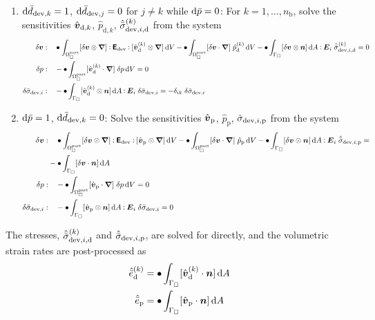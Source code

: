 \documentclass[a4paper]{article}
\newcommand{\particle}{\mathrm{part}}
\newcommand{\dep}{\mathrm{p}}
\newcommand{\ded}{\mathrm{d}}
\begin{document}
\begin{enumerate}
 \item $\operatorname{d \!}\bar{d}_{\mathrm{dev},k} = 1$, $\operatorname{d \!}\bar{d}_{\mathrm{dev},j} = 0$ for $j\neq k$ while $\operatorname{d \!}\bar{p} = 0$: For $k = 1, \ldots, n_\mathrm{b}$, solve the sensitivities $\hat{\ta v}_{\ded,k}$, $\hat{p}_{\ded,k}$, $\hat{\bar{\sigma}}_{\dev,i,\ded}^{(k)}$ from the system 
\begin{subequations}\label{eq:sensitivities_d}
\begin{align}
 \delta\ta v :&\quad 
 \bullet \int_{\Omega_\Box^\particle} [\delta\ta v\outerp\diff] \dprod \tf E_\dev \dprod [\hat{\ta v}_{\ded}^{(k)}\outerp\diff] \dif V - \bullet\int_{\Omega_\Box^\particle} [\delta\ta v\cdot\diff]\;\hat{p}_{\ded}^{(k)} \dif V 
  -\bullet \int_{\Gamma_\Box} [\delta\ta v\outerp\ta n] \dif A\dprod \ts E_i\;\hat{\bar{\sigma}}_{\dev,i,\ded}^{(k)}
  = 0
 \\ %
 \delta p :&\quad 
 -\bullet \int_{\Omega_\Box^\particle} [\hat{\ta v}_{\ded}^{(k)}\cdot\diff]\;\delta p\dif V = 0
 \\ %
 \delta\bar{\sigma}_{\dev,i} :&\quad
 -\bullet\int_{\Gamma_\Box} [\hat{\ta v}_{\ded}^{(k)} \outerp \ta n] \dif A \dprod \ts E_i \;\delta\bar{\sigma}_{\dev,i} = -\delta_{ik} \; \delta\bar{\sigma}_{\dev,i}
\end{align}
\end{subequations}
\item $\operatorname{d \!}\bar{p} = 1$, $\operatorname{d \!}\bar{d}_{\mathrm{dev},k} = 0$: Solve the sensitivities $\hat{\ta v}_\dep$, $\hat{p}_\dep$, $\hat{\sigma}_{\dev,i,\dep}$ from the system 
\begin{subequations}\label{eq:sensitivities_p}
\begin{align}
 \delta\ta v :&\quad 
 \bullet \int_{\Omega_\Box^\particle} [\delta\ta v\outerp\diff] \dprod \tf E_\dev \dprod [\hat{\ta v}_\dep\outerp\diff] \dif V - \bullet\int_{\Omega_\Box^\particle} [\delta\ta v\cdot\diff]\;\hat{p}_\dep \dif V 
  -\bullet \int_{\Gamma_\Box} [\delta\ta v\outerp\ta n] \dif A\dprod \ts E_i\;\hat{\bar{\sigma}}_{\dev,i,\dep}
  = \nonumber\\&-\bullet\int_{\Gamma_\Box}[\delta\ta v\cdot \ta n]\dif A
 \\ %
 \delta p :&\quad 
 -\bullet \int_{\Omega_\Box^\particle} [\hat{\ta v}_\dep\cdot\diff]\;\delta p\dif V = 0
 \\ %
 \delta\bar{\sigma}_{\dev,i} :&\quad
 -\bullet\int_{\Gamma_\Box} [\hat{\ta v}_\dep \outerp \ta n] \dif A \dprod \ts E_i \;\delta\bar{\sigma}_{\dev,i} = 0
\end{align}
\end{subequations}
\end{enumerate}
The stresses, $\hat{\bar{\sigma}}_{\dev,i,\ded}^{(k)}$ and $\hat{\bar{\sigma}}_{\dev,i,\dep}$, are solved for directly, and the volumetric strain rates are post-processed as
\begin{align}
 \hat{\bar{e}}_{\ded}^{(k)} &= \bullet\int_{\Gamma_\Box} [\hat{\ta v}_{\ded}^{(k)} \cdot \ta n]\dif A\\
 \hat{\bar{e}}_\dep &= \bullet\int_{\Gamma_\Box} [\hat{\ta v}_\dep \cdot \ta n]\dif A 
\end{align}
\end{document}
